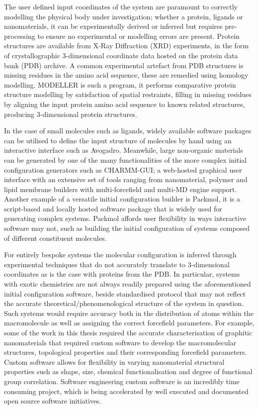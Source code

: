 The user defined input coordinates of the system are paramount to correctly modelling the physical body under investigation; whether a protein, ligands or nanomaterials, it can be experimentally derived or inferred but requires pre-processing to ensure no experimental or modelling errors are present. Protein structures are available from X-Ray Diffraction (XRD) experiments, in the form of crystallographic 3-dimensional coordinate data hosted on the protein data bank (PDB) archive.\cite{PDB} A common experimental artefact from PDB structures is missing residues in the amino acid sequence, these are remedied using homology modelling. MODELLER is such a program, it performs comparative protein structure modelling by satisfaction of spatial restraints, filling in missing residues by aligning the input protein amino acid sequence to known related structures, producing 3-dimensional protein structures.\cite{marti2000comparative, webb2016comparative} 

In the case of small molecules such as ligands, widely available software packages can be utilised to define the input structure of molecules by hand using an interactive interface such as Avogadro.\cite{hanwell2012avogadro} Meanwhile, large non-organic materials can be generated by one of the many functionalities of the more complex initial configuration generators such as CHARMM-GUI; a web-hosted graphical user interface with an extensive set of tools ranging from nanomaterial, polymer and lipid membrane builders with multi-forcefield and multi-MD engine support.\cite{jo2008charmm,Lee2020} Another example of a versatile initial configuration builder is Packmol, it is a script-based and locally hosted software package that is widely used for generating complex systems.\cite{martinez2009packmol} Packmol affords user flexibility in ways interactive software may not, such as building the initial configuration of systems composed of different constituent molecules.

For entirely bespoke systems the molecular configuration is inferred through experimental techniques that do not accurately translate to 3-dimensional coordinates as is the case with proteins from the PDB. In particular, systems with exotic chemistries are not always readily prepared using the aforementioned initial configuration software, beside standardised protocol that may not reflect the accurate theoretical/phenomenological structure of the system in question. Such systems would require accuracy both in the distribution of atoms within the macromolecule as well as assigning the correct forcefield parameters. For example, some of the work in this thesis required the accurate characterisation of graphitic nanomaterials that required custom software to develop the macromolecular structures, topological properties and their corresponding forcefield parameters.\cite{albadri2020accurate-github} Custom software allows for flexibility in varying nanomaterial structural properties such as shape, size, chemical functionalisation and degree of functional group correlation. Software engineering custom software is an incredibly time consuming project, which is being accelerated by well executed and documented open source software initiatives.


